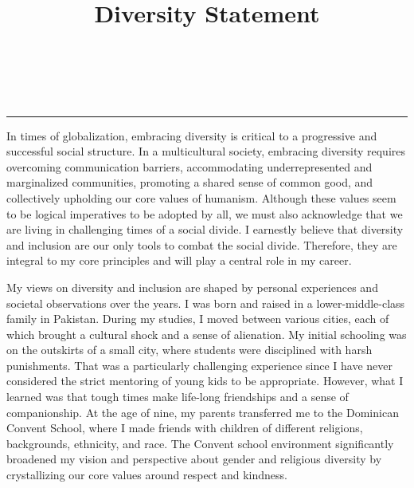 \documentclass{NSF}
\begin{document}
\title{Diversity Statement}\\
\\\rule{\textwidth}{1.5pt}\vspace{3mm}
\thispagestyle{empty}

In times of globalization, embracing diversity is critical to a progressive and successful social structure.  In a multicultural society, embracing diversity requires overcoming communication barriers, accommodating underrepresented and marginalized communities, promoting a shared sense of common good, and collectively upholding our core values of humanism. Although these values seem to be logical imperatives to be adopted by all, we must also acknowledge that we are living in challenging times of a social divide. I earnestly believe that diversity and inclusion are our only tools to combat the social divide. Therefore, they are integral to my core principles and will play a central role in my career.

\vspace{2mm}
My views on diversity and inclusion are shaped by personal experiences and societal observations over the years. I was born and raised in a lower-middle-class family in Pakistan. During my studies, I moved between various cities, each of which brought a cultural shock and a sense of alienation. My initial schooling was on the outskirts of a small city, where students were disciplined with harsh punishments. That was a particularly challenging experience since I have never considered the strict mentoring of young kids to be appropriate. However, what I learned was that tough times make life-long friendships and a sense of companionship. At the age of nine, my parents transferred me to the Dominican Convent School, where I made friends with children of different religions, backgrounds, ethnicity, and race. The Convent school environment significantly broadened my vision and perspective about gender and religious diversity by crystallizing our core values around respect and kindness. 
\end{document}
